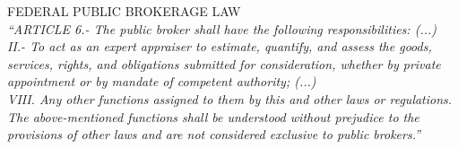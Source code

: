 \textcolor{principal}{FEDERAL PUBLIC BROKERAGE LAW}\\[10pt]

\textit{``ARTICLE 6.- The public broker shall have the following responsibilities: (...)}\\[10pt]

\textit{II.- To act as an expert appraiser to estimate, quantify, and assess the goods, services, rights, and obligations submitted for consideration, whether by private appointment or by mandate of competent authority; (...)}\\[10pt]

\textit{VIII. Any other functions assigned to them by this and other laws or regulations.}\\[10pt]


\textit{The above-mentioned functions shall be understood without prejudice to the provisions of other laws and are not considered exclusive to public brokers.''}\\[10pt]



